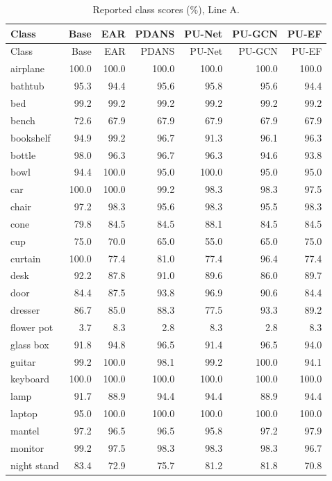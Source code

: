 {\setlength{\tabcolsep}{3pt}
\begin{longtable}{lrrrrrr}
\caption{Reported class scores (\%), Line A.}\\
\toprule Class & Base & EAR & PDANS & PU-Net & PU-GCN & PU-EF\\\midrule\endfirsthead
\toprule Class & Base & EAR & PDANS & PU-Net & PU-GCN & PU-EF\\\midrule\endhead
\bottomrule\endfoot
airplane & 100.0 & 100.0 & 100.0 & 100.0 & 100.0 & 100.0 \\
bathtub & 95.3 & 94.4 & 95.6 & 95.8 & 95.6 & 94.4 \\
bed & 99.2 & 99.2 & 99.2 & 99.2 & 99.2 & 99.2 \\
bench & 72.6 & 67.9 & 67.9 & 67.9 & 67.9 & 67.9 \\
bookshelf & 94.9 & 99.2 & 96.7 & 91.3 & 96.1 & 96.3 \\
bottle & 98.0 & 96.3 & 96.7 & 96.3 & 94.6 & 93.8 \\
bowl & 94.4 & 100.0 & 95.0 & 100.0 & 95.0 & 95.0 \\
car & 100.0 & 100.0 & 99.2 & 98.3 & 98.3 & 97.5 \\
chair & 97.2 & 98.3 & 95.6 & 98.3 & 95.5 & 98.3 \\
cone & 79.8 & 84.5 & 84.5 & 88.1 & 84.5 & 84.5 \\
cup & 75.0 & 70.0 & 65.0 & 55.0 & 65.0 & 75.0 \\
curtain & 100.0 & 77.4 & 81.0 & 77.4 & 96.4 & 77.4 \\
desk & 92.2 & 87.8 & 91.0 & 89.6 & 86.0 & 89.7 \\
door & 84.4 & 87.5 & 93.8 & 96.9 & 90.6 & 84.4 \\
dresser & 86.7 & 85.0 & 88.3 & 77.5 & 93.3 & 89.2 \\
flower pot & 3.7 & 8.3 & 2.8 & 8.3 & 2.8 & 8.3 \\
glass box & 91.8 & 94.8 & 96.5 & 91.4 & 96.5 & 94.0 \\
guitar & 99.2 & 100.0 & 98.1 & 99.2 & 100.0 & 94.1 \\
keyboard & 100.0 & 100.0 & 100.0 & 100.0 & 100.0 & 100.0 \\
lamp & 91.7 & 88.9 & 94.4 & 94.4 & 88.9 & 94.4 \\
laptop & 95.0 & 100.0 & 100.0 & 100.0 & 100.0 & 100.0 \\
mantel & 97.2 & 96.5 & 96.5 & 95.8 & 97.2 & 97.9 \\
monitor & 99.2 & 97.5 & 98.3 & 98.3 & 98.3 & 96.7 \\
night stand & 83.4 & 72.9 & 75.7 & 81.2 & 81.8 & 70.8 \\

\end{longtable}}
